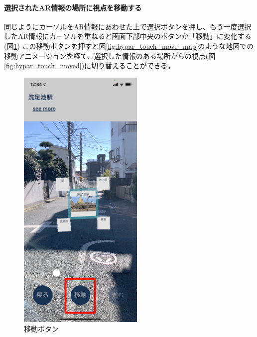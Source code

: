 \paragraph*{選択されたAR情報の場所に視点を移動する}
同じようにカーソルをAR情報にあわせた上で選択ボタンを押し、もう一度選択したAR情報にカーソルを重ねると画面下部中央のボタンが「移動」に変化する(図\ref{fig:hypar_touch_move_button})
この移動ボタンを押すと図\ref{fig:hypar_touch_move_map}のような地図での移動アニメーションを経て、選択した情報のある場所からの視点(図\ref{fig:hypar_touch_moved})に切り替えることができる。

\begin{figure}[h]
  \begin{minipage}{0.5\hsize}
    \centering
    \includegraphics[width=60mm]{images/hypar_touch_move_button.png}
    \caption{移動ボタン} \label{fig:hypar_touch_move_button}
  \end{minipage}
  \begin{minipage}{0.5\hsize}
    \centering

\end{minipage}
\end{figure}

